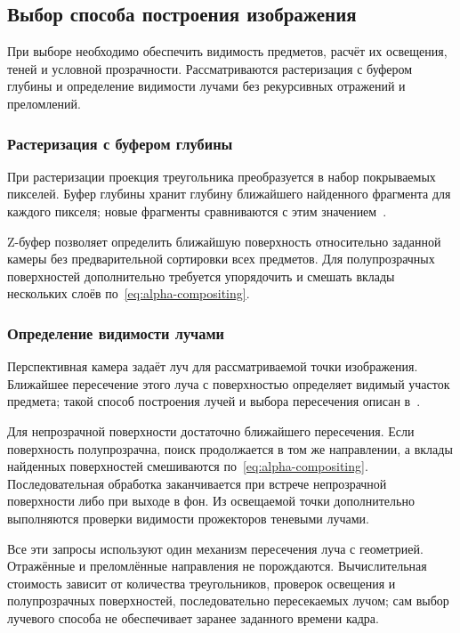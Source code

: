 \subsection{Выбор способа построения изображения}
\label{subsec:image}

При выборе необходимо обеспечить видимость предметов, расчёт их освещения, теней и условной прозрачности. Рассматриваются растеризация с буфером глубины и определение видимости лучами без рекурсивных отражений и преломлений.

\subsubsection{Растеризация с буфером глубины}

При растеризации проекция треугольника преобразуется в набор покрываемых пикселей. Буфер глубины хранит глубину ближайшего найденного фрагмента для каждого пикселя; новые фрагменты сравниваются с этим значением~\cite[слайды~2--5]{mit-rasterization}.

Z-буфер позволяет определить ближайшую поверхность относительно заданной камеры без предварительной сортировки всех предметов. Для полупрозрачных поверхностей дополнительно требуется упорядочить и смешать вклады нескольких слоёв по~\eqref{eq:alpha-compositing}.

\subsubsection{Определение видимости лучами}

Перспективная камера задаёт луч для рассматриваемой точки изображения. Ближайшее пересечение этого луча с поверхностью определяет видимый участок предмета; такой способ построения лучей и выбора пересечения описан в~\cite[разд.~1.2.1, 1.2.2]{pbrt4}.

Для непрозрачной поверхности достаточно ближайшего пересечения. Если поверхность полупрозрачна, поиск продолжается в том же направлении, а вклады найденных поверхностей смешиваются по~\eqref{eq:alpha-compositing}. Последовательная обработка заканчивается при встрече непрозрачной поверхности либо при выходе в фон. Из освещаемой точки дополнительно выполняются проверки видимости прожекторов теневыми лучами.

Все эти запросы используют один механизм пересечения луча с геометрией. Отражённые и преломлённые направления не порождаются. Вычислительная стоимость зависит от количества треугольников, проверок освещения и полупрозрачных поверхностей, последовательно пересекаемых лучом; сам выбор лучевого способа не обеспечивает заранее заданного времени кадра.

